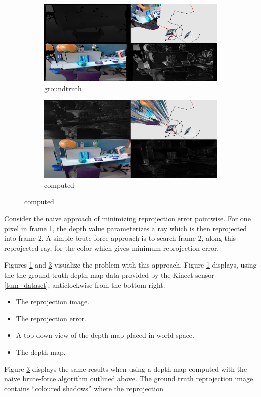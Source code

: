 \documentclass[conference]{IEEEtran}
\begin{document}
\begin{figure}[htbp]
\begin{subfigure}[b]{0.5\textwidth}
\centerline{\includegraphics[width=\textwidth]{figures/noisevis_groundtruth.png}}
\caption{groundtruth}
\label{noisevis_groundtruth}
\end{subfigure}
\begin{subfigure}[b]{0.5\textwidth}
\centerline{\includegraphics[width=\textwidth]{figures/noisevis_computed.png}}
\caption{computed}
\label{noisevis_computed}
\end{subfigure}
\end{figure}

Consider the naive approach of minimizing reprojection error pointwise. For one pixel in frame 1, the depth value parameterizes a ray which
is then reprojected into frame 2. A simple brute-force approach is to search frame 2, along this reprojected ray, for the color which gives minimum
reprojection error.

Figures \ref{noisevis_groundtruth} and \ref{noisevis_computed} visualize the problem with this approach.
Figure \ref{noisevis_groundtruth} displays, using the the ground truth depth map data provided by the Kinect sensor \ref{tum_dataset}, anticlockwise
from the bottom right:
\begin{itemize}
    \item The reprojection image.
    \item The reprojection error.
    \item A top-down view of the depth map placed in world space.
    \item The depth map.
\end{itemize}
Figure \ref{noisevis_computed} displays the same results when using a depth map computed with the naive brute-force algorithm outlined above.
The ground truth reprojection image contains ``coloured shadows'' where the reprojection
\end{document}
